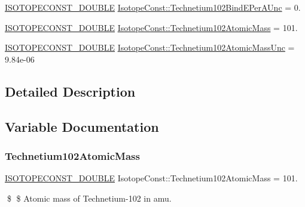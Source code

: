 \begin{DoxyCompactItemize}
\mbox{\hyperlink{group___isotope_const-_macros_ga8f45a7272ce02c0b4c65c44636ed719a}{I\+S\+O\+T\+O\+P\+E\+C\+O\+N\+S\+T\+\_\+\+D\+O\+U\+B\+LE}} \mbox{\hyperlink{group___isotope_const-_technetium-_tc102_ga4924ec687d64cb7e04b1af3a69b91d8b}{Isotope\+Const\+::\+Technetium102\+Bind\+E\+Per\+A\+Unc}} = 0.
\item 
\mbox{\hyperlink{group___isotope_const-_macros_ga8f45a7272ce02c0b4c65c44636ed719a}{I\+S\+O\+T\+O\+P\+E\+C\+O\+N\+S\+T\+\_\+\+D\+O\+U\+B\+LE}} \mbox{\hyperlink{group___isotope_const-_technetium-_tc102_ga667bc9e20edad235caaf87d9c8fe4fed}{Isotope\+Const\+::\+Technetium102\+Atomic\+Mass}} = 101.
\item 
\mbox{\hyperlink{group___isotope_const-_macros_ga8f45a7272ce02c0b4c65c44636ed719a}{I\+S\+O\+T\+O\+P\+E\+C\+O\+N\+S\+T\+\_\+\+D\+O\+U\+B\+LE}} \mbox{\hyperlink{group___isotope_const-_technetium-_tc102_ga146832276c253590668cadaf540ca7e9}{Isotope\+Const\+::\+Technetium102\+Atomic\+Mass\+Unc}} = 9.\+84e-\/06
\end{DoxyCompactItemize}


\subsection{Detailed Description}


\subsection{Variable Documentation}
\mbox{\label{group___isotope_const-_technetium-_tc102_ga667bc9e20edad235caaf87d9c8fe4fed}} 
\subsubsection{\texorpdfstring{Technetium102\+Atomic\+Mass}{Technetium102AtomicMass}}
{\footnotesize\ttfamily \mbox{\hyperlink{group___isotope_const-_macros_ga8f45a7272ce02c0b4c65c44636ed719a}{I\+S\+O\+T\+O\+P\+E\+C\+O\+N\+S\+T\+\_\+\+D\+O\+U\+B\+LE}} Isotope\+Const\+::\+Technetium102\+Atomic\+Mass = 101.}

\$ \$ Atomic mass of Technetium-\/102 in amu. \mbox{\label{group___isotope_const-_technetium-_tc102_ga146832276c253590668cadaf540ca7e9}} 
